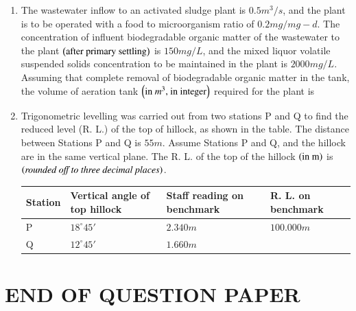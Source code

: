 \documentclass[journal,12pt,onecolumn]{IEEEtran}
\theoremstyle{remark}
\begin{document}
\begin{enumerate}
\hfill{}

\item The wastewater inflow to an activated sludge plant is $0.5 m^3
/s$, and the plant is to be operated with a food to microorganism ratio of $0.2 mg/mg-d$. The concentration of influent biodegradable organic matter of the wastewater to the plant $\left(\text{after primary settling}\right)$ is $150 mg/L$, and the mixed liquor volatile suspended solids concentration to be maintained in the plant is $2000 mg/L$. Assuming that complete removal of biodegradable organic matter in the tank, the volume of aeration tank $\left(\text{in $m^3$, in integer}\right)$ required for the plant is \underline{\hspace{3cm}}

\hfill{}

\item Trigonometric levelling was carried out from two stations P and Q to find the reduced level (R. L.) of the top of hillock, as shown in the table. The distance between Stations P and Q is $55 m$. Assume Stations P and Q, and the hillock are in the same vertical plane. The R. L. of the top of the hillock $\left(\text{in m}\right)$ is \underline{\hspace{3cm}} $\left(\textit{rounded off to three decimal places}\right)$.

\hfill{}

\begin{table}[H]
\centering
\begin{tabular}{|l|l|l|l|}
\hline
\textbf{Station} & \textbf{Vertical angle of top hillock} & \textbf{Staff reading on benchmark} & \textbf{R. L. on benchmark}\\
\hline
P & $18^\circ 45'$ & $2.340m$ & $100.000m$\\
Q & $12^\circ 45'$ & $1.660m$ & \\
\hline
\end{tabular}
\end{table}

\end{enumerate}

\section*{END OF QUESTION PAPER}
\end{document}
